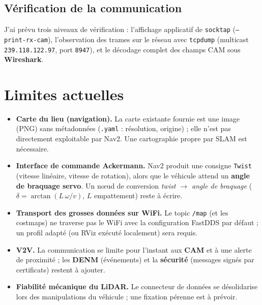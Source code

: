 \documentclass[a4paper,11pt]{article}
\begin{document}
\subsection{Vérification de la communication}
J'ai prévu trois niveaux de vérification : l'affichage applicatif de
\texttt{socktap} (\texttt{--print-rx-cam}), l'observation des trames sur le réseau
avec \texttt{tcpdump} (multicast \texttt{239.118.122.97}, port \texttt{8947}), et
le décodage complet des champs CAM sous \textbf{Wireshark}.

\section{Limites actuelles}
\begin{itemize}[leftmargin=1.4em]
  \item \textbf{Carte du lieu (navigation).} La carte existante fournie est une
        image (PNG) sans métadonnées (\texttt{.yaml} : résolution, origine) ; elle
        n'est pas directement exploitable par Nav2. Une cartographie propre par SLAM
        est nécessaire.
  \item \textbf{Interface de commande Ackermann.} Nav2 produit une consigne
        \texttt{Twist} (vitesse linéaire, vitesse de rotation), alors que le
        véhicule attend un \textbf{angle de braquage servo}. Un n{\oe}ud de
        conversion \emph{twist $\rightarrow$ angle de braquage}
        ($\delta = \arctan(L\,\omega / v)$, $L$ empattement) reste à écrire.
  \item \textbf{Transport des grosses données sur WiFi.} Le topic \texttt{/map}
        (et les costmaps) ne traverse pas le WiFi avec la configuration FastDDS par
        défaut ; un profil adapté (ou RViz exécuté localement) sera requis.
  \item \textbf{V2V.} La communication se limite pour l'instant aux \textbf{CAM} et
        à une alerte de proximité ; les \textbf{DENM} (événements) et la
        \textbf{sécurité} (messages signés par certificats) restent à ajouter.
  \item \textbf{Fiabilité mécanique du LiDAR.} Le connecteur de données se
        désolidarise lors des manipulations du véhicule ; une fixation pérenne est
        à prévoir.
\end{itemize}

\end{document}

